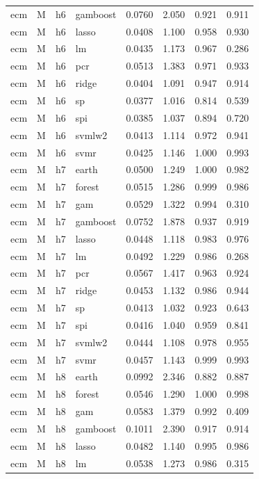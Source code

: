 \begin{ThreePartTable}
\begin{longtable}[t]{llclcccc}
ecm & M & h6 & gamboost & 0.0760 & 2.050 & 0.921 & 0.911\\
ecm & M & h6 & lasso & 0.0408 & 1.100 & 0.958 & 0.930\\
ecm & M & h6 & lm & 0.0435 & 1.173 & 0.967 & 0.286\\
ecm & M & h6 & pcr & 0.0513 & 1.383 & 0.971 & 0.933\\
ecm & M & h6 & ridge & 0.0404 & 1.091 & 0.947 & 0.914\\
ecm & M & h6 & sp & 0.0377 & 1.016 & 0.814 & 0.539\\
ecm & M & h6 & spi & 0.0385 & 1.037 & 0.894 & 0.720\\
ecm & M & h6 & svmlw2 & 0.0413 & 1.114 & 0.972 & 0.941\\
ecm & M & h6 & svmr & 0.0425 & 1.146 & 1.000 & 0.993\\
\addlinespace
ecm & M & h7 & earth & 0.0500 & 1.249 & 1.000 & 0.982\\
ecm & M & h7 & forest & 0.0515 & 1.286 & 0.999 & 0.986\\
ecm & M & h7 & gam & 0.0529 & 1.322 & 0.994 & 0.310\\
ecm & M & h7 & gamboost & 0.0752 & 1.878 & 0.937 & 0.919\\
ecm & M & h7 & lasso & 0.0448 & 1.118 & 0.983 & 0.976\\
ecm & M & h7 & lm & 0.0492 & 1.229 & 0.986 & 0.268\\
ecm & M & h7 & pcr & 0.0567 & 1.417 & 0.963 & 0.924\\
ecm & M & h7 & ridge & 0.0453 & 1.132 & 0.986 & 0.944\\
ecm & M & h7 & sp & 0.0413 & 1.032 & 0.923 & 0.643\\
ecm & M & h7 & spi & 0.0416 & 1.040 & 0.959 & 0.841\\
ecm & M & h7 & svmlw2 & 0.0444 & 1.108 & 0.978 & 0.955\\
ecm & M & h7 & svmr & 0.0457 & 1.143 & 0.999 & 0.993\\
\addlinespace
ecm & M & h8 & earth & 0.0992 & 2.346 & 0.882 & 0.887\\
ecm & M & h8 & forest & 0.0546 & 1.290 & 1.000 & 0.998\\
ecm & M & h8 & gam & 0.0583 & 1.379 & 0.992 & 0.409\\
ecm & M & h8 & gamboost & 0.1011 & 2.390 & 0.917 & 0.914\\
ecm & M & h8 & lasso & 0.0482 & 1.140 & 0.995 & 0.986\\
ecm & M & h8 & lm & 0.0538 & 1.273 & 0.986 & 0.315\\

\end{longtable}
\end{ThreePartTable}
